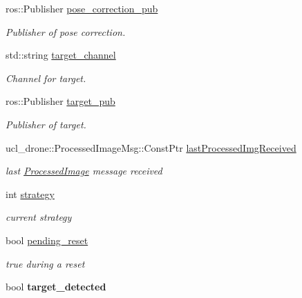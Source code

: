 \begin{DoxyCompactItemize}
\mbox{\label{classMappingNode_a38d028c0b4bb2f4fc4692046855372b2}} 
ros\+::\+Publisher \hyperlink{classMappingNode_a38d028c0b4bb2f4fc4692046855372b2}{pose\+\_\+correction\+\_\+pub}
\begin{DoxyCompactList}\small\item\em Publisher of pose correction. \end{DoxyCompactList}\item 
\mbox{\label{classMappingNode_a28926a34cd7b7a9f78ecf18d6694d0e2}} 
std\+::string \hyperlink{classMappingNode_a28926a34cd7b7a9f78ecf18d6694d0e2}{target\+\_\+channel}
\begin{DoxyCompactList}\small\item\em Channel for target. \end{DoxyCompactList}\item 
\mbox{\label{classMappingNode_af0c6505ace8e4868f338ea3dc544c85f}} 
ros\+::\+Publisher \hyperlink{classMappingNode_af0c6505ace8e4868f338ea3dc544c85f}{target\+\_\+pub}
\begin{DoxyCompactList}\small\item\em Publisher of target. \end{DoxyCompactList}\item 
\mbox{\label{classMappingNode_a7083893a6a4bd5755b6cf04f1f9cc008}} 
ucl\+\_\+drone\+::\+Processed\+Image\+Msg\+::\+Const\+Ptr \hyperlink{classMappingNode_a7083893a6a4bd5755b6cf04f1f9cc008}{last\+Processed\+Img\+Received}
\begin{DoxyCompactList}\small\item\em last \hyperlink{classProcessedImage}{Processed\+Image} message received \end{DoxyCompactList}\item 
\mbox{\label{classMappingNode_a1bdd3a86b880b4fc73f397f36ad49d74}} 
int \hyperlink{classMappingNode_a1bdd3a86b880b4fc73f397f36ad49d74}{strategy}
\begin{DoxyCompactList}\small\item\em current strategy \end{DoxyCompactList}\item 
\mbox{\label{classMappingNode_a13d71a5d6e02e7dfceebfcd94d57f39c}} 
bool \hyperlink{classMappingNode_a13d71a5d6e02e7dfceebfcd94d57f39c}{pending\+\_\+reset}
\begin{DoxyCompactList}\small\item\em true during a reset \end{DoxyCompactList}\item 
\mbox{\label{classMappingNode_a7024e23c7cd63b2f18ac48eff9ffcc37}} 
bool {\bfseries target\+\_\+detected}
\end{DoxyCompactItemize}


